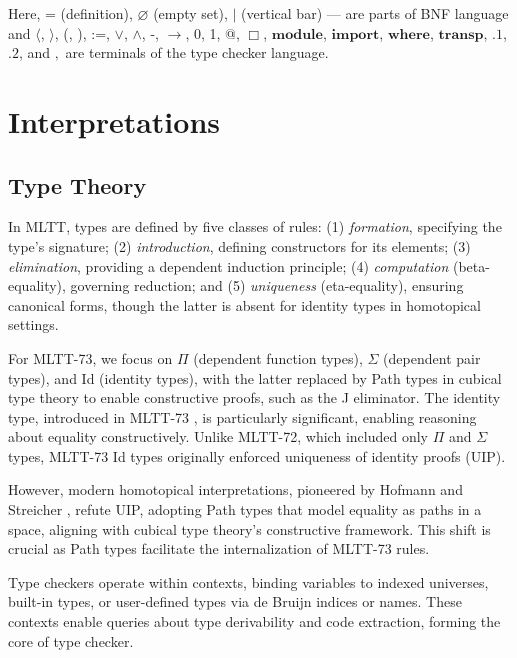 \documentclass{article}
\theoremstyle{definition}
\begin{document}
Here, = (definition), $\varnothing$ (empty set), $\rvert$ (vertical bar) --- are parts of BNF language and
$\langle$, $\rangle$, (, ), :=, $\vee$, $\wedge$, -, $\rightarrow$, 0, 1, @, $\Box$,
$\mathbf{module}$, $\mathbf{import}$, $\mathbf{where}$, $\mathbf{transp}$, $\mathbf{.1}$, $\mathbf{.2}$,
and $,$ are terminals of the type checker language.

\section{Interpretations}

\subsection{Type Theory}

In MLTT, types are defined by five classes of rules:
(1) \textit{formation}, specifying the type’s signature;
(2) \textit{introduction}, defining constructors for its elements;
(3) \textit{elimination}, providing a dependent induction principle;
(4) \textit{computation} (beta-equality), governing reduction; and
(5) \textit{uniqueness} (eta-equality), ensuring canonical forms,
though the latter is absent for identity types in homotopical settings.

For MLTT-73, we focus on $\Pi$ (dependent function types), $\Sigma$ (dependent pair types),
and Id (identity types), with the latter replaced by Path types in cubical type theory
to enable constructive proofs, such as the J eliminator.
The identity type, introduced in MLTT-73 \cite{Lof75}, is particularly significant,
enabling reasoning about equality constructively. Unlike MLTT-72, which included
only $\Pi$ and $\Sigma$ types, MLTT-73 Id types originally enforced uniqueness
of identity proofs (UIP).

However, modern homotopical interpretations, pioneered by Hofmann and
Streicher \cite{Hofmann96}, refute UIP, adopting Path types that model equality
as paths in a space, aligning with cubical type theory’s constructive framework.
This shift is crucial as Path types facilitate the internalization of MLTT-73 rules.

Type checkers operate within contexts, binding variables to indexed universes,
built-in types, or user-defined types via de Bruijn indices or names. These
contexts enable queries about type derivability and code extraction, forming
the core of type checker.
\end{document}
